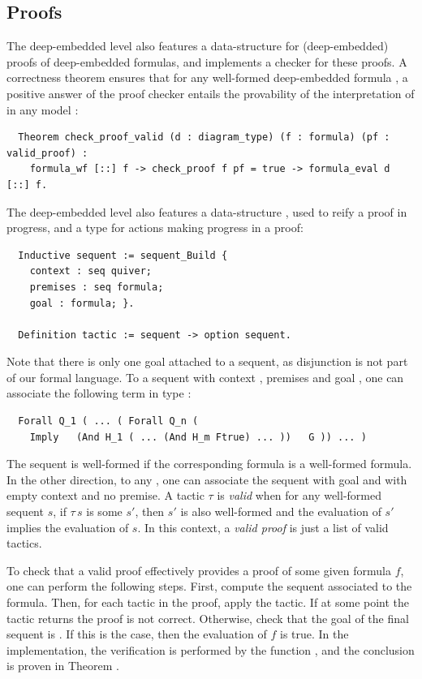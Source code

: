 \documentclass[a4paper,UKenglish,cleveref, autoref, thm-restate]{lipics-v2021}
\begin{document}
\subsection{Proofs}

The deep-embedded level also features a data-structure  for (deep-embedded) proofs of deep-embedded formulas, and implements a checker  for these proofs. A correctness theorem ensures that for any well-formed deep-embedded formula , a positive answer of the proof checker entails the provability of the interpretation of  in any model :
\begin{verbatim}
  Theorem check_proof_valid (d : diagram_type) (f : formula) (pf : valid_proof) :
    formula_wf [::] f -> check_proof f pf = true -> formula_eval d [::] f.
\end{verbatim}

The deep-embedded level also features a data-structure , used to reify a proof in progress, and a type  for actions making progress in a proof:
\begin{verbatim}
  Inductive sequent := sequent_Build {
    context : seq quiver;
    premises : seq formula;
    goal : formula; }.

  Definition tactic := sequent -> option sequent.
\end{verbatim}
Note that there is only one goal attached to a sequent, as disjunction is not part of our formal language. To a sequent with context \coq{[:: Q_1 ; ... ; Q_n ]}, premises \coq{[:: H_1 ; ... ; H_m ]} and goal , one can associate the following term in type :
\begin{verbatim}
  Forall Q_1 ( ... ( Forall Q_n (
    Imply   (And H_1 ( ... (And H_m Ftrue) ... ))   G )) ... )
\end{verbatim}
The sequent is well-formed if the corresponding formula is a well-formed formula. In the other direction, to any , one can associate the sequent with goal  and with empty context and no premise. A tactic $\tau$ is \emph{valid} when for any well-formed sequent $s$, if $\tau\,s$ is some $s'$, then $s'$ is also well-formed and the evaluation of $s'$ implies the evaluation of $s$. In this context, a \emph{valid proof} is just a list of valid tactics.

To check that a valid proof effectively provides a proof of some given formula $f$, one can perform the following steps. First, compute the sequent associated to the formula. Then, for each tactic in the proof, apply the tactic. If at some point the tactic returns  the proof is not correct. Otherwise, check that the goal of the final sequent is . If this is the case, then the evaluation of $f$ is true. In the implementation, the verification is performed by the function , and the conclusion is proven in Theorem .
\end{document}
